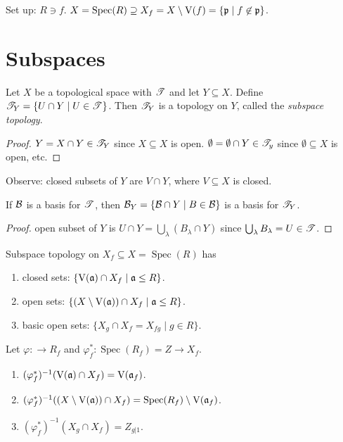 \noindent Set up: $R \ni f$. $X = \operatorname{Spec}(R) \supseteq X_f = X \setminus \operatorname{V}(f) = \{\mathfrak{p} \mid f \not \in \mathfrak{p}\}$.

\section*{Subspaces}

\begin{proposition}
    Let $X$ be a topological space with $\mathscr{T}$ and let $Y \subseteq X$. Define $\mathscr{T}_Y = \{U \cap Y \mid U \in \mathscr{T}\}$. Then $\mathscr{T}_Y$ is a topology on $Y$, called the \emph{subspace topology}.
\end{proposition}

\begin{proof}
    $Y = X \cap Y \in \mathscr{T}_Y$ since $X \subseteq X$ is open. $\emptyset = \emptyset \cap Y  \in \mathscr{T}_y$ since $\emptyset \subseteq X$ is open, etc. 
\end{proof}

\noindent Observe: closed subsets of $Y$ are $V \cap Y$, where $V \subseteq X$ is closed.

\begin{proposition}
    If $\mathcal{B}$ is a basis for $\mathscr{T}$, then $\mathcal{B}_Y = \{\mathcal{B} \cap Y \mid B \in \mathcal{B}\}$ is a basis for $\mathscr{T}_Y$.
\end{proposition}

\begin{proof}
    open subset of $Y$ is $U \cap Y = \bigcup_\lambda (B_\lambda \cap Y)$ since $\bigcup_\lambda B_\lambda = U \in \mathscr{T}$.
\end{proof}

\begin{corollary}
    Subspace topology on $X_f \subseteq X = \operatorname{Spec}(R)$ has 
    \begin{enumerate}
        \item closed sets: $\{\operatorname{V}(\mathfrak{a}) \cap X_f \mid \mathfrak{a} \leq R\}$.
        \item open sets: $\{(X \setminus \operatorname{V}(\mathfrak{a}))\cap X_f \mid \mathfrak{a} \leq R\}$.
        \item basic open sets: $\{X_g \cap X_f = X_{fg} \mid g \in R\}$.
    \end{enumerate}
\end{corollary}

\begin{proposition}
    Let $\varphi: \to R_f$ and $\varphi_f^*: \operatorname{Spec}(R_f) = Z \to X_f$. 
    \begin{enumerate}
        \item 
            $(\varphi_f^*)^{-1}(\operatorname{V}(\mathfrak{a}) \cap X_f) = \operatorname{V}(\mathfrak{a}_f)$. 
        \item
            $(\varphi_f^*)^{-1}((X \setminus \operatorname{V}(\mathfrak{a})) \cap X_f) = \operatorname{Spec}(R_f) \setminus \operatorname{V}(\mathfrak{a}_f)$.
        \item 
            $(\varphi_f^*)^{-1}(X_g \cap X_f) = Z_{g|1}$.
    \end{enumerate}
\end{proposition}

